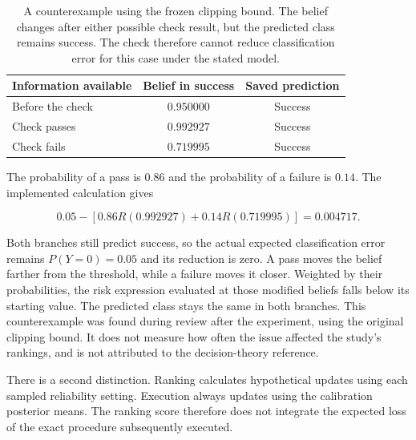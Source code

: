 \begin{table}[htbp]
  \centering
  \begin{tabular}{@{}lcc@{}}
    \toprule
    Information available & Belief in success & Saved prediction \\
    \midrule
    Before the check & $0.950000$ & Success \\
    Check passes & $0.992927$ & Success \\
    Check fails & $0.719995$ & Success \\
    \bottomrule
  \end{tabular}
  \caption{A counterexample using the frozen clipping bound. The belief changes after either possible check result, but the
  predicted class remains success. The check therefore cannot reduce classification error for this case under the stated model.}
  \label{tab:acquisition-counterexample}
\end{table}

The probability of a pass is $0.86$ and the probability of a failure is $0.14$. The implemented calculation gives

\begin{equation}
  0.05-\left[0.86R(0.992927)+0.14R(0.719995)\right]=0.004717.
\end{equation}

Both branches still predict success, so the actual expected classification error remains $P(Y=0)=0.05$ and its reduction is
zero. A pass moves the belief farther from the threshold, while a failure moves it closer. Weighted by their probabilities,
the risk expression evaluated at those modified beliefs falls below its starting value. The predicted class stays the same
in both branches. This counterexample was found during review after the experiment, using the original clipping bound.
It does not measure how often the issue affected the study's rankings, and is not attributed to the decision-theory reference.

There is a second distinction. Ranking calculates hypothetical updates using each sampled reliability setting. Execution always
updates using the calibration posterior means. The ranking score therefore does not integrate the expected loss of the exact
procedure subsequently executed.

